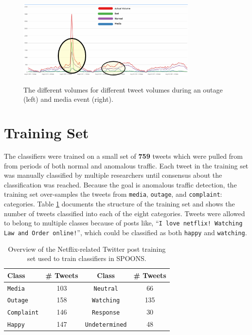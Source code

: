 \documentclass[12pt]{ucthesis}
\newcommand{\captionfonts}{\small\bf\ssp}
\begin{document}
\begin{figure}
   \begin{center}
      \includegraphics[width=0.8\textwidth]{images/groups.eps}
      \captionfonts
      \caption[SPOONS Groups]{The different volumes for different tweet volumes during an outage (left) and media event (right).}
      \label{fig:groups}
   \end{center}
\end{figure}

\section{Training Set}
\label{class-training-set}

The classifiers were trained on a small set of \textbf{759} tweets which were pulled from from periods of both normal and
anomalous traffic. Each tweet in the training set was manually classified by multiple researchers until consensus
about the classification was reached. Because the goal is anomalous traffic detection, the training set over-samples the
tweets from \texttt{media}, \texttt{outage}, and \texttt{complaint}: categories. Table \ref{table:classCounts} documents
the structure of the training set and shows the  number of tweets classified into each of the eight categories.
Tweets were allowed to belong to multiple classes because of posts like, ``\texttt{I love netflix! Watching Law and Order
online!}'', which could be classified as both \texttt{happy} and \texttt{watching}.

\begin{table}
   \begin{center}
      \begin{tabular}{|l|c|c|c|}
         \hline
         Class  & \# Tweets & Class & \# Tweets
         \tabularnewline\hline
         \texttt{Media} & 103 & \texttt{Neutral} & 66
         \tabularnewline\hline
         \texttt{Outage} & 158  & \texttt{Watching} &  135
         \tabularnewline\hline
         \texttt{Complaint}  & 146 &  \texttt{Response} &  30
         \tabularnewline\hline
         \texttt{Happy}  & 147  & \texttt{Undetermined}  & 48
         \tabularnewline\hline
      \end{tabular}
      \caption{Overview of the Netflix-related Twitter post training set used to train classifiers in SPOONS.}
      \label{table:classCounts}
   \end{center}
\end{table}
\end{document}
